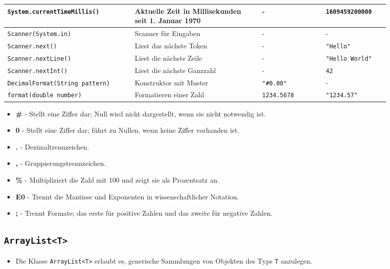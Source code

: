 \documentclass[a4paper,10pt, dvipsnames]{report}
\newcommand{\javaInLine}[1]{\texttt{#1}}
\begin{document}
\begin{longtable}{|p{0.3\linewidth}|p{0.3\linewidth}|p{0.15\linewidth}|p{0.15\linewidth}|}
\javaInLine{System.currentTimeMillis()} & Aktuelle Zeit in Millisekunden seit 1. Januar 1970 & - & \texttt{1609459200000} \\
\hline

\javaInLine{Scanner(System.in)} & Scanner für Eingaben & - & - \\
\javaInLine{Scanner.next()} & Liest das nächste Token & - & \texttt{"Hello"} \\
\javaInLine{Scanner.nextLine()} & Liest die nächste Zeile & - & \texttt{"Hello World"} \\
\javaInLine{Scanner.nextInt()} & Liest die nächste Ganzzahl & - & \texttt{42} \\
\hline

\javaInLine{DecimalFormat(String pattern)} & Konstruktor mit Muster & \texttt{"\#0.00"} & - \\
\javaInLine{format(double number)} & Formatieren einer Zahl & \texttt{1234.5678} & \texttt{"1234.57"} \\
\hline
\end{longtable}

\begin{itemize}
    \item \textbf{\#} - Stellt eine Ziffer dar; Null wird nicht dargestellt, wenn sie nicht notwendig ist.
    \item \textbf{0} - Stellt eine Ziffer dar; führt zu Nullen, wenn keine Ziffer vorhanden ist.
    \item \textbf{.} - Dezimaltrennzeichen.
    \item \textbf{,} - Gruppierungstrennzeichen.
    \item \textbf{\%} - Multipliziert die Zahl mit 100 und zeigt sie als Prozentsatz an.
    \item \textbf{E0} - Trennt die Mantisse und Exponenten in wissenschaftlicher Notation.
    \item \textbf{;} - Trennt Formate; das erste für positive Zahlen und das zweite für negative Zahlen.
\end{itemize}

\normalsize

\subsection{\javaInLine{ArrayList<T>}}

\begin{itemize}
	\item Die Klasse \javaInLine{ArrayList<T>} erlaubt es, generische Sammlungen von Objekten des Typs \javaInLine{T} anzulegen.
\end{itemize}
\end{document}
